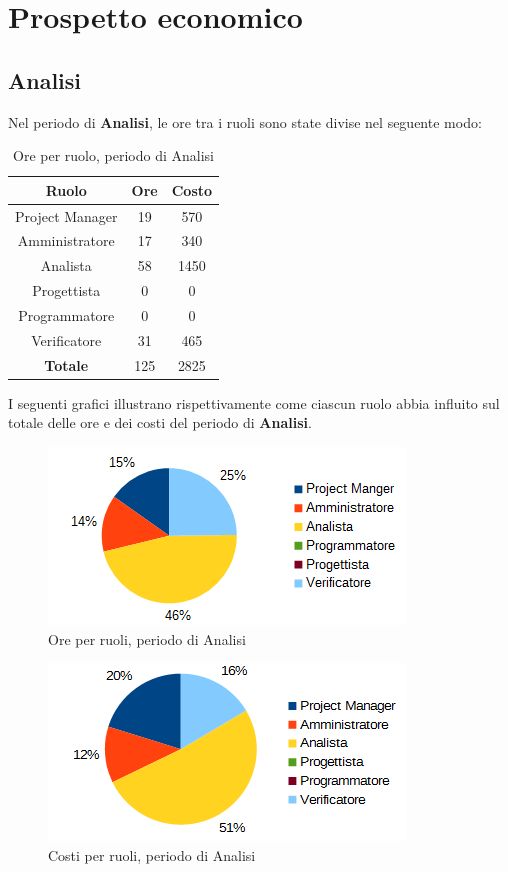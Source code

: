 \section{Prospetto economico}
	\subsection{Analisi}
	Nel periodo di \textbf{Analisi}, le ore tra i ruoli sono state divise nel seguente modo: \\
	\begin{table}[H]
		\centering
		\begin{tabular}{|c|c|c|}
			\hline
			\textbf{Ruolo}		& \textbf{Ore}	& \textbf{Costo} \\
			\hline
			Project Manager		& 19			& 570	\\
			Amministratore		& 17			& 340	\\
			Analista			& 58			& 1450	\\
			Progettista			& 0				& 0	\\
			Programmatore		& 0				& 0	\\
			Verificatore		& 31			& 465	\\
			\hline
			\textbf{Totale}		& 125			& 2825	\\
			\hline
		\end{tabular}
		\caption{Ore per ruolo, periodo di Analisi}
		\end{table}
	I seguenti grafici illustrano rispettivamente come ciascun ruolo abbia influito sul totale
delle ore e dei costi del periodo di \textbf{Analisi}. \\
	\begin{figure}[H]
		\centering
		\includegraphics[scale=1]{immagini/grafici/analisi-torta.png}
		\caption{Ore per ruoli, periodo di Analisi}
	\end{figure}
	\begin{figure}[H]
		\centering
		\includegraphics[scale=1]{immagini/grafici/analisi-torta-costo.png}
		\caption{Costi per ruoli, periodo di Analisi}
	\end{figure}
